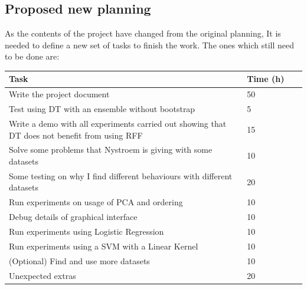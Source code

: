 \documentclass{article}
\begin{document}
    \subsection{Proposed new planning}

    As the contents of the project have changed from the original planning,
    It is needed to define a new set of tasks to finish the work. The ones which
    still need to be done are:

    \begin{table}[H]
\begin{tabular}{|p{0.8\linewidth}|p{0.2\linewidth}|}
\hline
\textbf{Task} & \textbf{Time (h)} \\ \hline
Write the project document & 50\\\hline
Test using DT with an ensemble without bootstrap& 5\\ \hline
Write a demo with all experiments carried out showing that DT does
not benefit from using RFF & 15\\ \hline
Solve some problems that Nystroem is giving with some datasets& 10\\ \hline
Some testing on why I find different behaviours with different
datasets& 20\\ \hline
Run experiments on usage of PCA and ordering& 10\\ \hline
Debug details of graphical interface& 10\\ \hline
Run experiments using Logistic Regression& 10\\ \hline
Run experiments using a SVM with a Linear Kernel& 10\\ \hline
(Optional) Find and use more datasets& 10\\ \hline
Unexpected extras& 20\\ \hline


\end{tabular}
\end{table}
\end{document}
